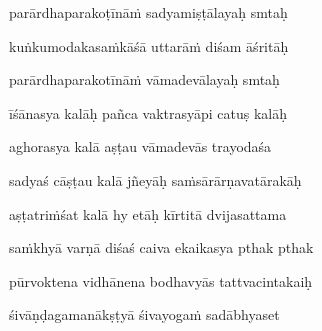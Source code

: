 parārdhaparakoṭīnāṁ sadyamiṣṭālayaḥ smtaḥ \veg\dontdisplaylinenum
{}

kuṅkumodakasaṁkāśā uttarāṁ diśam āśritāḥ\thinspace{\dandab} \dontdisplaylinenum
{}

parārdhaparakotīnāṁ vāmadevālayaḥ smtaḥ \veg\dontdisplaylinenum
{}

īśānasya kalāḥ pañca vaktrasyāpi catuṣ kalāḥ\thinspace{\dandab} \dontdisplaylinenum
{}

aghorasya kalā aṣṭau vāmadevās trayodaśa \veg\dontdisplaylinenum
{}

sadyaś cāṣṭau kalā jñeyāḥ saṁsārārṇavatārakāḥ\thinspace{\dandab} \dontdisplaylinenum
{}

aṣṭatriṁśat kalā hy etāḥ kīrtitā dvijasattama \veg\dontdisplaylinenum
{}

saṁkhyā varṇā diśaś caiva ekaikasya pthak pthak\thinspace{\dandab} \dontdisplaylinenum
{}

pūrvoktena vidhānena bodhavyās tattvacintakaiḥ \veg\dontdisplaylinenum
{}

śivāṇḍagamanākṣṭyā śivayogaṁ sadābhyaset\thinspace{\dandab} \dontdisplaylinenum
{}

